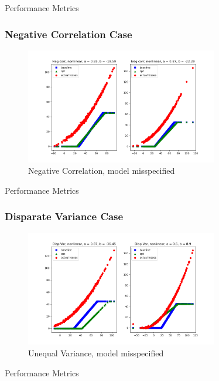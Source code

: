 \documentclass[11pt]{article}
\begin{document}
    \begin{table}[H]
        \centering
        \small
        \caption{Performance Metrics}
        \resizebox*{\columnwidth}{!}{}
    \end{table}

    \subsubsection{Negative Correlation Case}
    \begin{figure}[H]
        \centering
        \caption{Negative Correlation, model misspecified}
        \includegraphics[width=0.75\textwidth]{../../output/figures/Exploration/neg_correlation_nonlinear.png}
    \end{figure}

    \begin{table}[H]
        \centering
        \small
        \caption{Performance Metrics}
        \resizebox*{\columnwidth}{!}{}
    \end{table}

    \subsubsection{Disparate Variance Case}
    \begin{figure}[H]
        \centering
        \caption{Unequal Variance, model misspecified}
        \includegraphics[width=0.75\textwidth]{../../output/figures/Exploration/disp_var_nonlinear.png}
    \end{figure}

    \begin{table}[H]
        \centering
        \small
        \caption{Performance Metrics}
        \resizebox*{\columnwidth}{!}{}
    \end{table}

  
\end{document}
